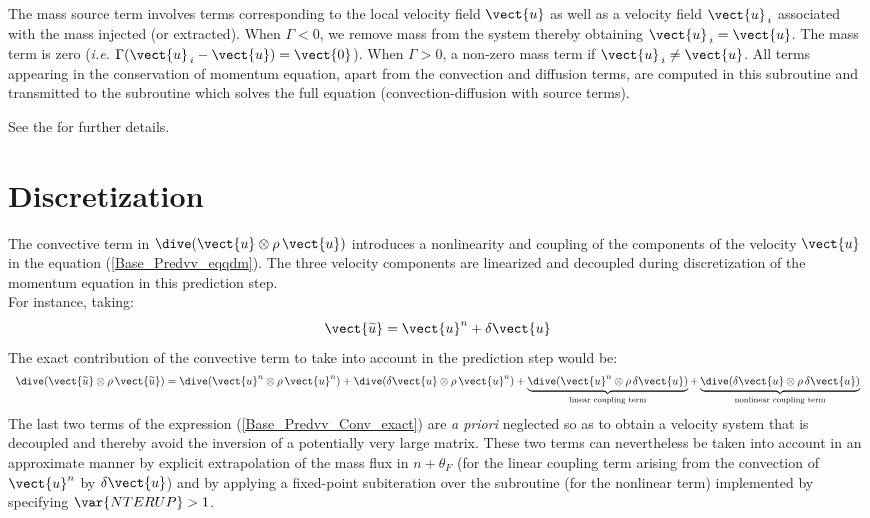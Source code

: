 The mass source term involves terms corresponding to the local velocity field
$\vect {u}$ as well as a velocity field $\vect {u}_{\,i}$
associated with the mass injected (or extracted). When $\Gamma<0$, we remove mass from the system thereby
obtaining $\vect{u}_{\,i} = \vect{u}$. The mass term is zero (\emph{i.e.} $\Gamma
(\vect{u}_{\,i}-\vect{u})= \vect{0} $). When $\Gamma>0$, a non-zero
mass term if $\vect{u}_{\,i} \ne \vect{u}$.
All terms appearing in the conservation of momentum equation, apart from
the convection and diffusion terms, are computed in this subroutine and
transmitted to the
subroutine  which solves the full equation (convection-diffusion with source terms).

See the  for further details.

\section*{Discretization}

The convective term in $\dive(\vect{u} \otimes \rho\,\vect{u})$
introduces a nonlinearity and coupling of the components of the velocity
$\vect{u}$ in the equation (\ref{Base_Predvv_eqqdm}). The three velocity
components are linearized and decoupled during discretization of the momentum
equation in this prediction step.\\
For instance, taking:
\begin{equation}
\vect{\widetilde{u}}= \vect{u}^n + \delta \vect{u}
\end{equation}
The exact contribution of the convective term to take into account in the prediction step would be:
\begin{equation}\label{Base_Predvv_Conv_exact}
\begin{array}{ll}
\dive(\vect{\widetilde{u}} \otimes \rho\,\vect{\widetilde{u}}) =
\dive(\vect{u}^{n} \otimes \rho\,\vect{u}^{n}) + \dive(\delta \vect{u} \otimes
\rho\,\vect{u}^{n}) +  \underbrace { \dive(\vect{u}^{n} \otimes
\rho\,\delta \vect{u})}_{\text {linear coupling term}} +  \underbrace { \dive(\delta \vect{u} \otimes
\rho\,\delta \vect{u})}_{\text {nonlinear coupling term}}\\
\end{array}
\end{equation}
The last two terms of the expression (\ref{Base_Predvv_Conv_exact}) are {\em a priori} neglected
so as to obtain a velocity system that is decoupled and thereby avoid the
inversion of a potentially very large matrix. These two terms can
nevertheless be taken into account in an approximate manner by explicit
extrapolation of the mass flux in $n+\theta_F$ (for the linear coupling term
arising from the convection of $\vect{u}^{n}$ by $\delta \vect{u}$) and by
applying a fixed-point subiteration over the subroutine  (for
the nonlinear term) implemented by specifying  $\var{NTERUP}>1$.

